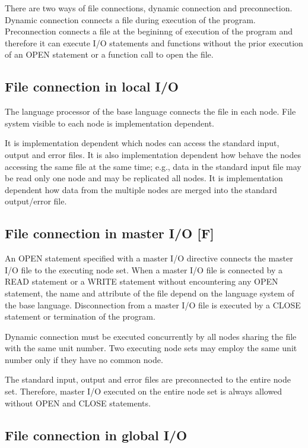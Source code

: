   There are two ways of file connections, dynamic connection and
  preconnection.
  Dynamic connection connects a file during execution of the program.
  Preconnection connects a file at the begininng of execution of the
  program and therefore it can execute I/O statements and functions
  without the prior execution of an OPEN statement or a function call to
  open the file.

  \subsection{File connection in local I/O}

  The language processor of the base language connects the file in each
  node.
  File system visible to each node is implementation dependent.

  It is implementation dependent which nodes can access the standard
  input, output and error files.
  It is also implementation dependent how behave the nodes accessing the
  same file at the same time; e.g., data in the standard input file may
  be read only one node and may be replicated all nodes.
  It is implementation dependent how data from the multiple nodes are
  merged into the standard output/error file.
  
  \subsection{File connection in master I/O [F]}

  An OPEN statement specified with a master I/O directive connects the
  master I/O file to the executing node set.
  When a master I/O file is connected by a READ statement or a WRITE
  statement without encountering any OPEN statement, the name and
  attribute of the file depend on the language system of the base
  language.
  Disconnection from a master I/O file is executed by a CLOSE statement
  or termination of the program.

  Dynamic connection must be executed concurrently by all nodes sharing
  the file with the same unit number.
  Two executing node sets may employ the same unit number only if they
  have no common node.

  The standard input, output and error files are preconnected to the
  entire node set.
  Therefore, master I/O executed on the entire node set is always
  allowed without OPEN and CLOSE statements.


  \subsection{File connection in global I/O}

